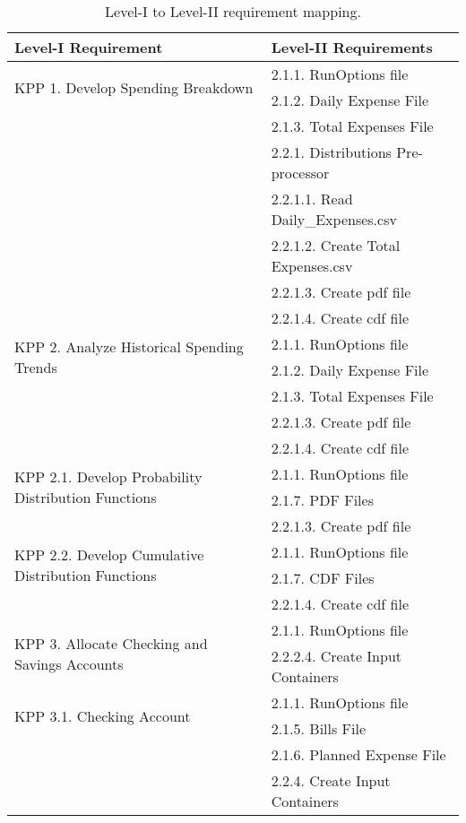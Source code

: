 {\begin{table}[h!]
  \begin{center}
   \caption{Level-I to Level-II requirement mapping.}
    \label{tab:table1}
    \begin{tabular}{l|l}
      \textbf{Level-I Requirement} & \textbf{Level-II Requirements} \\
      \hline
      \hline
      \multirow{2}{*}{KPP 1. Develop Spending Breakdown} & 2.1.1. RunOptions file \\ 
      & 2.1.2. Daily Expense File  \\  & 2.1.3. Total Expenses File 
      \\ & 2.2.1. Distributions Pre-processor \\ & 2.2.1.1. Read Daily\_Expenses.csv \\
      & 2.2.1.2. Create Total Expenses.csv \\ & 2.2.1.3. Create pdf file \\ & 2.2.1.4. Create cdf file \\
      \hline
      \multirow{2}{*}{KPP 2. Analyze Historical Spending Trends} & 2.1.1. RunOptions file \\ 
      & 2.1.2. Daily Expense File  \\  & 2.1.3. Total Expenses File \\ & 2.2.1.3. Create pdf file \\
      & 2.2.1.4. Create cdf file \\
      \hline
      \multirow{2}{*}{KPP 2.1. Develop Probability Distribution Functions} & 2.1.1. RunOptions file \\ 
      & 2.1.7. PDF Files \\ & 2.2.1.3. Create pdf file \\
      \hline
      \multirow{2}{*}{KPP 2.2. Develop Cumulative Distribution Functions} & 2.1.1. RunOptions file \\ 
      & 2.1.7. CDF Files \\ & 2.2.1.4. Create cdf file \\
      \hline
      \multirow{2}{*}{KPP 3. Allocate Checking and Savings Accounts} & 2.1.1. RunOptions file \\ 
      & 2.2.2.4. Create Input Containers \\
      \hline
      \multirow{2}{*}{KPP 3.1. Checking Account} & 2.1.1. RunOptions file \\ 
      & 2.1.5. Bills File \\ & 2.1.6. Planned Expense File \\ & 2.2.4. Create Input Containers \\

\end{tabular}
\end{center}
\end{table}}

